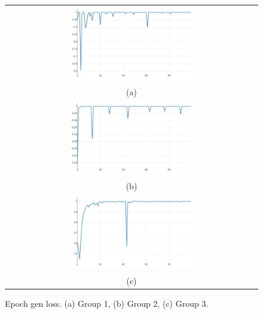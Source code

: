 \documentclass[10pt,twocolumn,letterpaper]{article}
\begin{document}
\begin{figure}%
\centering\begin{tabular}{c}
\includegraphics[width=0.5\textwidth]{fig15-a}\\
(a)\\[3ex]%
\includegraphics[width=0.5\textwidth]{fig15-b}\\
(b)\\[3ex]
\includegraphics[width=0.5\textwidth]{fig15-c}\\
(c)
\end{tabular}
\caption{Epoch gen loss. (a) Group 1, (b) Group 2, (c) Group 3.}%
\label{fig15}%
\end{figure}
\end{document}
